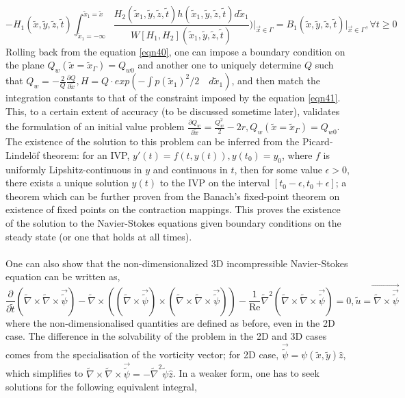 \documentclass{article}
\begin{document}
\begin{equation} \label{eqn41}
- H_1(\tilde{x}, \tilde{y}, \tilde{z}, \tilde{t}) \int_{\tilde{x}_1 = -\infty}^{\tilde{x}_1 = \tilde{x}} \frac{H_2(\tilde{x}_1, \tilde{y}, \tilde{z}, \tilde{t})h(\tilde{x}_1, \tilde{y}, \tilde{z}, \tilde{t})d\tilde{x}_1}{W[H_1, H_2](\tilde{x}_1, \tilde{y}, \tilde{z}, \tilde{t})}\bigg) \bigg|_{\vec{x} \in \Gamma}= B_1(\tilde{x}, \tilde{y}, \tilde{z}, \tilde{t})\bigg|_{\vec{x} \in \Gamma}, \forall t \ge 0
\end{equation}
Rolling back from the equation \ref{eqn40}, one can impose a boundary condition on the plane $Q_w(\tilde{x} = \tilde{x}_\Gamma) = Q_{w0}$ and another one to uniquely determine $Q$ such that $Q_w = -\frac{2}{Q}\frac{\partial Q}{\partial \tilde{x}}, H = Q \cdot exp(-\int p(\tilde{x}_1)^2/2 \quad d\tilde{x}_1)$, and then match the integration constants to that of the constraint imposed by the equation \ref{eqn41}. This, to a certain extent of accuracy (to be discussed sometime later), validates the formulation of an initial value problem $\frac{\partial Q_w}{\partial \tilde{x}} = \frac{Q_w^2}{2} - 2r, Q_w(\tilde{x} = \tilde{x}_\Gamma) = Q_{w0}$. The existence of the solution to this problem can be inferred from the Picard-Lindel\"of theorem: for an IVP, $y'(t) = f(t, y(t)), y(t_0) = y_0$, where $f$ is uniformly Lipshitz-continuous in $y$ and continuous in $t$, then for some value $\epsilon > 0$, there exists a unique solution $y(t)$ to the IVP on the interval $[t_0-\epsilon,t_0+\epsilon]$; a theorem which can be further proven from the Banach's fixed-point theorem on existence of fixed points on the contraction mappings. This proves the existence of the solution to the Navier-Stokes equations given boundary conditions on the steady state (or one that holds at all times). \\ \\
One can also show that the non-dimensionalized 3D incompressible Navier-Stokes equation can be written as,
\begin{equation} \label{eqn43}
\frac{\partial}{\partial \tilde{t}}(\tilde{\nabla}\times\tilde{\nabla}\times\vec{\tilde{\psi}}) - \tilde{\nabla} \times ((\tilde{\nabla} \times \vec{\tilde{\psi}})\times(\tilde{\nabla} \times \tilde{\nabla} \times \vec{\tilde{\psi}})) - \frac{1}{\operatorname{Re}} \tilde{\nabla}^2(\tilde{\nabla}\times\tilde{\nabla}\times\vec{\tilde{\psi}}) = 0, \vec{\tilde{u} = \tilde{\nabla} \times \vec{\tilde{\psi}}}
\end{equation}
where the non-dimensionalised quantities are defined as before, even in the 2D case. The difference in the solvability of the problem in the 2D and 3D cases comes from the specialisation of the vorticity vector; for 2D case, $\vec{\tilde{\psi}} = \psi(\tilde{x},\tilde{y}) \hat{z}$, which simplifies to $\tilde{\nabla}\times\tilde{\nabla}\times\vec{\tilde{\psi}} = -\tilde{\nabla}^2 \tilde{\psi} \hat{z}$. In a weaker form, one has to seek solutions for the following equivalent integral,
\end{document}
